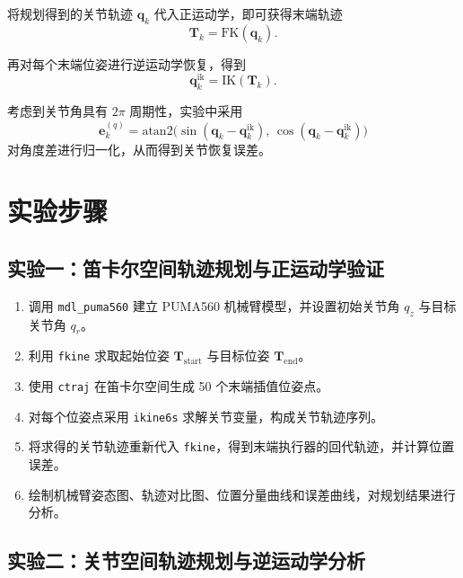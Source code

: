 \documentclass[UTF8,a4paper,12pt]{ctexart}
\begin{document}
将规划得到的关节轨迹 $\mathbf{q}_k$ 代入正运动学，即可获得末端轨迹
\begin{equation}
\mathbf{T}_k=\mathrm{FK}(\mathbf{q}_k).
\end{equation}

再对每个末端位姿进行逆运动学恢复，得到
\begin{equation}
\mathbf{q}^{\mathrm{ik}}_k=\mathrm{IK}(\mathbf{T}_k).
\end{equation}

考虑到关节角具有 $2\pi$ 周期性，实验中采用
\begin{equation}
\mathbf{e}^{(q)}_k=\mathrm{atan2}\big(\sin(\mathbf{q}_k-\mathbf{q}^{\mathrm{ik}}_k),\,\cos(\mathbf{q}_k-\mathbf{q}^{\mathrm{ik}}_k)\big)
\label{eq:joint_err}
\end{equation}
对角度差进行归一化，从而得到关节恢复误差。

\section{实验步骤}

\subsection{实验一：笛卡尔空间轨迹规划与正运动学验证}

\begin{enumerate}
  \item 调用 \texttt{mdl\_puma560} 建立 PUMA560 机械臂模型，并设置初始关节角 $q_z$ 与目标关节角 $q_r$。
  \item 利用 \texttt{fkine} 求取起始位姿 $\mathbf{T}_{\text{start}}$ 与目标位姿 $\mathbf{T}_{\text{end}}$。
  \item 使用 \texttt{ctraj} 在笛卡尔空间生成 50 个末端插值位姿点。
  \item 对每个位姿点采用 \texttt{ikine6s} 求解关节变量，构成关节轨迹序列。
  \item 将求得的关节轨迹重新代入 \texttt{fkine}，得到末端执行器的回代轨迹，并计算位置误差。
  \item 绘制机械臂姿态图、轨迹对比图、位置分量曲线和误差曲线，对规划结果进行分析。
\end{enumerate}

\subsection{实验二：关节空间轨迹规划与逆运动学分析}
\end{document}
